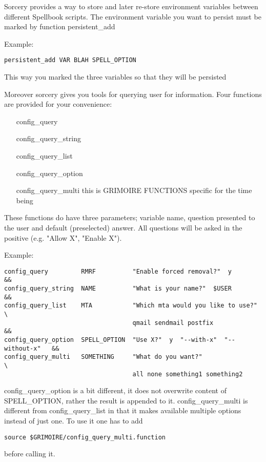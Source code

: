 \documentclass[a4paper,10pt]{book}
\begin{document}
Sorcery provides a way to store and later re-store environment variables
between different Spellbook scripts. The environment variable you want to
persist must be marked by function persistent\_add

Example:
\begin{verbatim}
persistent_add VAR BLAH SPELL_OPTION
\end{verbatim}

This way you marked the three variables so that they will be persisted

Moreover sorcery gives you tools for querying user for information. Four
functions are provided for your convenience:
\begin{itemize}
\item[config\_query]
\item[config\_query\_string]
\item[config\_query\_list]
\item[config\_query\_option]
\item[config\_query\_multi]
this is GRIMOIRE FUNCTIONS specific for the time being
\end{itemize}

These functions do have three parameters; variable name, question presented to
the user and default (preselected) answer. All questions will be asked in the
positive (e.g. "Allow X", "Enable X").

Example:
\begin{verbatim}
config_query         RMRF          "Enable forced removal?"  y              &&
config_query_string  NAME          "What is your name?"  $USER              &&
config_query_list    MTA           "Which mta would you like to use?"       \
                                   qmail sendmail postfix                   &&
config_query_option  SPELL_OPTION  "Use X?"  y  "--with-x"  "--without-x"   &&
config_query_multi   SOMETHING     "What do you want?"                      \
                                   all none something1 something2
\end{verbatim}

config\_query\_option is a bit different, it does not overwrite content of
\textdollar SPELL\_OPTION, rather the result is appended to it.
config\_query\_multi is
different from config\_query\_list in that it makes available multiple options
instead of just one. To use it one has to add
\begin{verbatim}
source $GRIMOIRE/config_query_multi.function
\end{verbatim}
before calling it.
\end{document}
